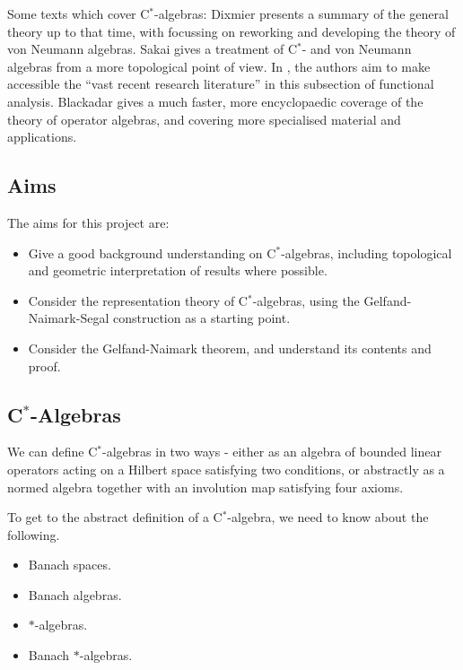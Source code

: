 \documentclass[12pt,a4paper]{amsart}
\theoremstyle{plain}
\theoremstyle{definition}
\begin{document}
	Some texts which cover C$^\ast$-algebras: 
	Dixmier \cite{dixmier77} presents a summary of the general theory up to that time, with \cite{dixmier81} focussing on reworking and developing the theory of von Neumann algebras. 
	Sakai \cite{sakai71} gives a treatment of C$^\ast$- and von Neumann algebras from a more topological point of view.
	In \cite{kadison83,kadison86}, the authors aim to make accessible the ``vast recent research literature'' in this subsection of functional analysis.
	Blackadar \cite{blackadar06} gives a much faster, more encyclopaedic coverage of the theory of operator algebras, and covering more specialised material and applications.
	

\subsection{Aims}
The aims for this project are:
\begin{itemize}
	\item Give a good background understanding on C$^\ast$-algebras, including topological and geometric interpretation of results where possible.
	\item Consider the representation theory of C$^\ast$-algebras, using the Gelfand-Naimark-Segal construction as a starting point.
	\item Consider the Gelfand-Naimark theorem, and understand its contents and proof.
\end{itemize}
	
\subsection{C$^\ast$-Algebras}
We can define C$^\ast$-algebras in two ways - either as an algebra of bounded linear operators acting on a Hilbert space satisfying two conditions, or abstractly as a normed algebra together with an involution map satisfying four axioms.

	To get to the abstract definition of a C$^\ast$-algebra, we need to know about the following.
\begin{itemize}
	\item Banach spaces.
	\item Banach algebras.
	\item $\ast$-algebras.
	\item Banach $\ast$-algebras.
\end{itemize}
\end{document}
